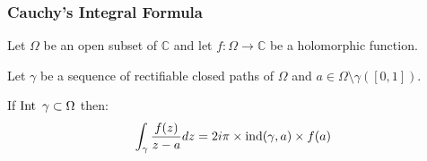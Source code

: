 \subsubsection{Cauchy's Integral Formula}
\begin{thm*}
    Let $\Omega$ be an open subset of $\mathbb{C}$ and let $f: \Omega \rightarrow \mathbb{C}$ be a holomorphic function.

    Let $\gamma$ be a sequence of rectifiable closed paths of $\Omega$ and $a\in\Omega\setminus\gamma([0,1])$.

    If $\operatorname{Int}~\gamma\subset\Omega$ then:
    $$\int_\gamma \frac{f(z)}{z-a}dz = 2i\pi \times \operatorname{ind}(\gamma, a) \times f(a)$$
\end{thm*}


